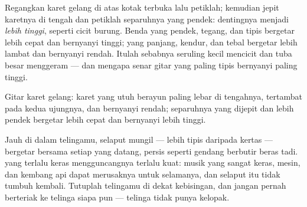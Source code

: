 \begin{example}\label{ex:g3:sound-around-us:pitch}
Regangkan karet gelang di atas kotak terbuka lalu petiklah; kemudian
jepit karetnya di tengah dan petiklah separuhnya yang pendek:
dentingnya menjadi \emph{lebih tinggi}, seperti cicit burung. Benda
yang pendek, tegang, dan tipis bergetar lebih cepat dan bernyanyi
tinggi; yang panjang, kendur, dan tebal bergetar lebih lambat dan
bernyanyi rendah. Itulah sebabnya seruling kecil mencicit dan tuba
besar menggeram --- dan mengapa senar gitar yang paling tipis
bernyanyi paling tinggi.
\end{example}

\begin{omfigure}

{\small Gitar karet gelang: karet yang utuh berayun paling lebar di
tengahnya, tertambat pada kedua ujungnya, dan bernyanyi rendah;
separuhnya yang dijepit dan lebih pendek bergetar lebih cepat dan
bernyanyi lebih tinggi.}
\end{omfigure}

\begin{remark}\label{rem:g3:sound-around-us:ears}
Jauh di dalam telingamu, selaput mungil --- lebih tipis daripada
kertas --- bergetar bersama setiap  yang datang, persis seperti
gendang berbutir beras tadi.  yang terlalu keras mengguncangnya
terlalu kuat: musik yang sangat keras, mesin, dan kembang api dapat
merusaknya untuk selamanya, dan selaput itu tidak tumbuh kembali.
Tutuplah telingamu di dekat kebisingan, dan jangan pernah berteriak ke
telinga siapa pun --- telinga tidak punya kelopak.
\end{remark}

